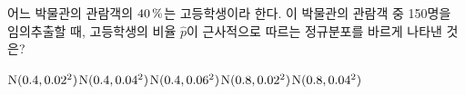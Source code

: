 어느 박물관의 관람객의 $40\mkern3mu \%$는 고등학생이라 한다. 이 박물관의 관람객 중 150명을 임의추출할 때, 고등학생의 비율 $\hat{p}$이 근사적으로 따르는 정규분포를 바르게 나타낸 것은?
\begin{choicesii}{$\mathrm{N}(0.4{,}\mkern3mu\mathopen{}0.02^2)$}{$\mathrm{N}(0.4{,}\mkern3mu\mathopen{}0.04^2)$}{$\mathrm{N}(0.4{,}\mkern3mu\mathopen{}0.06^2)$}{$\mathrm{N}(0.8{,}\mkern3mu\mathopen{}0.02^2)$}{$\mathrm{N}(0.8{,}\mkern3mu\mathopen{}0.04^2)$}\end{choicesii}
